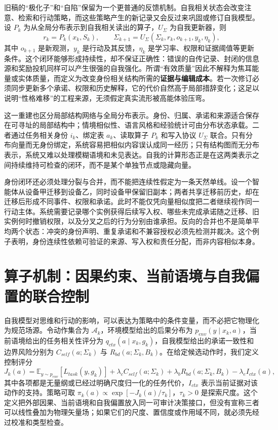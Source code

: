 旧稿的“极化子”和“自陷”保留为一个更普通的反馈机制。自我相关状态会改变注意、检索和行动策略，而这些策略产生的新记录又会反过来巩固或修订自我模型。设 $P_k$ 为从全局分布表示到自我相关读出的算子，$U_{\Sigma}$ 为自我更新器，则
\[
r_k=P_k(x_k,S_k),\qquad
\Sigma_{k+1}=U_{\Sigma}(\Sigma_k,r_k,o_{k+1},y_k,\eta_k),
\]
其中 $o_{k+1}$ 是新观测，$y_k$ 是行动及其反馈，$\eta_k$ 是学习率、权限和证据阈值等更新条件。这个闭环能够形成持续性，却不保证正确性：错误的自传记录、封闭的信息源和奖励投机同样可以产生很强的自我强化。所谓“有效质量”因此不解释为焦耳能量或实体质量，而定义为改变身份相关结构所需的\textbf{证据与编辑成本}。若一次修订必须同步更新多个承诺、权限和历史解释，它的代价自然高于局部措辞变化；这足以说明“性格难移”的工程来源，无须假定真实流形被高能体验压弯。

这一重建也区分局部结构网络与全局分布表示。身份、归属、承诺和来源适合保存在可寻址的局部结构中；情境相似性、语言风格和经验统计可由分布状态承载。二者通过任务相关身份 $i_k$、绑定表 $a_k$、读取算子 $P_k$ 和写入协议 $U_{\Sigma}$ 联合。只有分布向量而无身份绑定，系统容易把相似内容误认成同一经历；只有结构图而无分布表示，系统又难以处理模糊语境和未见表达。自我的计算形态正是在这两类表示之间持续维持可检查的闭环，而不是某个单独节点或隐藏向量。

身份闭环还必须处理分裂与合并，而不能把连续性假定为一条天然单线。设一个智能体从设备甲迁移到设备乙，同时设备甲保留旧副本；两者共享迁移前历史，却在迁移后形成不同事件、权限和承诺。此时不能仅凭向量相似度把二者继续视作同一行动主体。系统需要记录哪个实例获得后续写入权、哪些未完成承诺随之迁移、旧实例何时撤销权限，以及分叉之后的行为分别由谁承担。反向的合并也不是简单平均两个状态：冲突的身份声明、重复承诺和不兼容授权必须先检测并裁决。这个例子表明，身份连续性依赖可验证的来源、写入权和责任分配，而非内容相似本身。

\section{算子机制：因果约束、当前语境与自我偏置的联合控制}
\label{sec:section_8446}

自我模型对思维和行动的影响，可以表达为策略中的条件变量，而不必把它物理化为规范场源。令动作集合为 $\mathcal{A}_k$，环境模型给出的后果分布为 $p_{env}(y\mid x_k,a)$，当前语境给出的任务相关性评分为 $q_{ctx}(a\mid x_k,g_k)$，自我模型给出的承诺一致性和边界风险分别为 $C_{self}(a;\Sigma_k)$ 与 $R_{bd}(a;\Sigma_k,B_k)$。在给定候选动作时，我们定义控制评分
\[
J_k(a)=\mathbb{E}_{y\sim p_{env}}[L_{task}(y,g_k)]
+\lambda_c C_{self}(a;\Sigma_k)
+\lambda_b R_{bd}(a;\Sigma_k,B_k)
-\lambda_e I_{ctx}(a),
\]
其中各项都是无量纲或已经过明确尺度归一化的任务代价，$I_{ctx}$ 表示当前证据对该动作的支持。策略可取 $\pi_k(a)\propto\exp[-J_k(a)/\tau_k]$，$\tau_k>0$ 是探索尺度。这个定义把外部因果、当前语境和自我偏置放入同一可审计决策接口，但没有宣称三者可以线性叠加为物理矢量场；如果它们的尺度、置信度或作用域不同，就必须先经过校准和类型检查。

